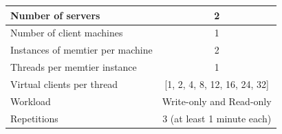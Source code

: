 \documentclass[report.tex]{subfiles}
\begin{document}
\begin{center}
	\scriptsize{
		\begin{tabular}{|l|c|}
			\hline Number of servers                & 2                        \\ 
			\hline Number of client machines        & 1                        \\ 
			\hline Instances of memtier per machine & 2                        \\ 
			\hline Threads per memtier instance     & 1                        \\
			\hline Virtual clients per thread       & [1, 2, 4, 8, 12, 16, 24, 32]\\ 
			\hline Workload                         & Write-only and Read-only \\
			\hline Repetitions                      & 3 (at least 1 minute each) \\ 
			\hline 
		\end{tabular}
	} 
\end{center}
\end{document}
